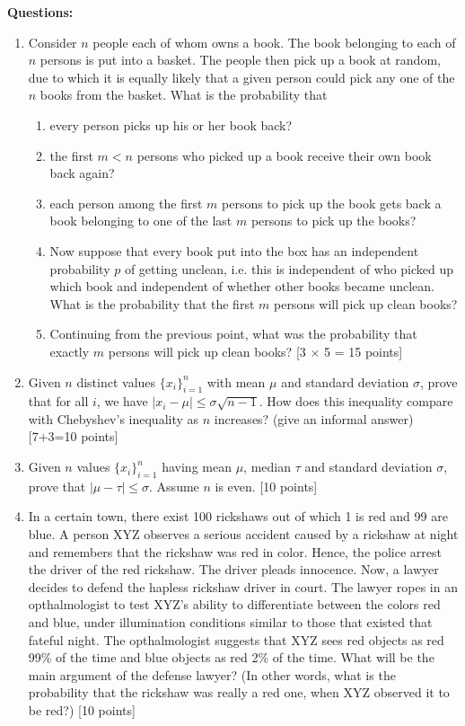 \documentclass[11pt]{article}
\begin{document}
\textbf{Questions:}
\begin{enumerate}
\item Consider $n$ people each of whom owns a book. The book belonging to each of $n$ persons is put into a basket. The people then pick up a book at random, due to which it is equally likely that a given person could pick any one of the $n$ books from the basket. What is the probability that
\begin{enumerate}
\item every person picks up his or her book back?
\item the first $m < n$ persons who picked up a book receive their own book back again?
\item each person among the first $m$ persons to pick up the book gets back a book belonging to one of the last $m$ persons to pick up the books?
\item Now suppose that every book put into the box has an independent probability $p$ of getting unclean, i.e. this is independent of who picked up which book and independent of whether other books became unclean. What is the probability that the first $m$ persons will pick up clean books? 
\item Continuing from the previous point, what was the probability that exactly $m$ persons will pick up clean books? \textsf{[3 $\times$ 5 = 15 points]}
\end{enumerate}

\item Given $n$ distinct values $\{x_i\}_{i=1}^n$ with mean $\mu$ and standard deviation $\sigma$, prove that for all $i$, we have $|x_i - \mu| \leq \sigma \sqrt{n-1}$. How does this inequality compare with Chebyshev's inequality as $n$ increases? (give an informal answer) \textsf{[7+3=10 points]}

\item Given $n$ values $\{x_i\}_{i=1}^n$ having mean $\mu$, median $\tau$ and standard deviation $\sigma$, prove that $|\mu-\tau| \leq \sigma$. Assume $n$ is even. \textsf{[10 points]}

\item In a certain town, there exist 100 rickshaws out of which 1 is red and 99 are blue. A person XYZ observes a serious accident caused by a rickshaw at night and remembers that the rickshaw was red in color. Hence, the police arrest the driver of the red rickshaw. The driver pleads innocence. Now, a lawyer decides to defend the hapless rickshaw driver in court. The lawyer ropes in an opthalmologist to test XYZ's ability to differentiate between the colors red and blue, under illumination conditions similar to those that existed that fateful night. The opthalmologist suggests that XYZ sees red objects as red 99\% of the time and blue objects as red 2\% of the time. What will be the main argument of the defense lawyer? (In other words, what is the probability that the rickshaw was really a red one, when XYZ observed it to be red?) \textsf{[10 points]}


\end{enumerate}
\end{document}
